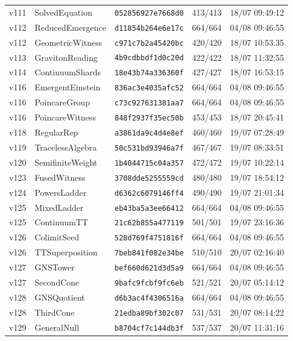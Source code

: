 \documentclass[11pt]{article}
\theoremstyle{definition}\newtheorem{deriv}{Derivação}
\begin{document}
{\begin{longtable}{@{}lllll@{}}
v111 & SolvedEquation & \texttt{052856927e7668d0} & 413/413 & 18/07 09:49:12 \\
v112 & ReducedEmergence & \texttt{d11854b264e6e17c} & 664/664 & 04/08 09:46:55 \\
v112 & GeometricWitness & \texttt{c971c7b2a45420bc} & 420/420 & 18/07 10:53:35 \\
v113 & GravitonReading & \texttt{4b9cdbbdf1d0c20d} & 422/422 & 18/07 11:32:55 \\
v114 & ContinuumShards & \texttt{18e43b74a336360f} & 427/427 & 18/07 16:53:15 \\
v116 & EmergentEinstein & \texttt{836ac3e4035afc52} & 664/664 & 04/08 09:46:55 \\
v116 & PoincareGroup & \texttt{c73c927631381aa7} & 664/664 & 04/08 09:46:55 \\
v116 & PoincareWitness & \texttt{848f2937f35ec50b} & 453/453 & 18/07 20:45:41 \\
v118 & RegularRep & \texttt{a3861da9c4d4e8ef} & 460/460 & 19/07 07:28:49 \\
v119 & TracelessAlgebra & \texttt{50c531bd93946a7f} & 467/467 & 19/07 08:33:51 \\
v120 & SemifiniteWeight & \texttt{1b4044715c04a357} & 472/472 & 19/07 10:22:14 \\
v123 & FusedWitness & \texttt{3708dde5255559cd} & 480/480 & 19/07 18:54:12 \\
v124 & PowersLadder & \texttt{d6362c6079146ff4} & 490/490 & 19/07 21:01:34 \\
v125 & MixedLadder & \texttt{eb43ba5a3ee66412} & 664/664 & 04/08 09:46:55 \\
v125 & ContinuumTT & \texttt{21c62b855a477119} & 501/501 & 19/07 23:16:36 \\
v126 & ColimitSeed & \texttt{528d769f4751816f} & 664/664 & 04/08 09:46:55 \\
v126 & TTSuperposition & \texttt{7beb841f082e34be} & 510/510 & 20/07 02:16:40 \\
v127 & GNSTower & \texttt{bef660d621d3d5a9} & 664/664 & 04/08 09:46:55 \\
v127 & SecondCone & \texttt{9bafc9fcbf9fc6eb} & 521/521 & 20/07 05:14:12 \\
v128 & GNSQuotient & \texttt{d6b3ac4f4306516a} & 664/664 & 04/08 09:46:55 \\
v128 & ThirdCone & \texttt{21edba89bf302c07} & 531/531 & 20/07 08:14:22 \\
v129 & GeneralNull & \texttt{b8704cf7c144db3f} & 537/537 & 20/07 11:31:16 \\

\end{longtable}}
\end{document}
